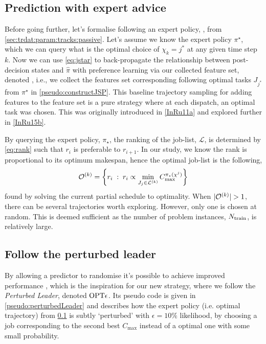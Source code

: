 \subsection{Prediction with expert advice}\label{sec:expertPolicy}
Before going further, let's formalise following an expert policy, 
\PhiSet{\OPT}, from \cref{sec:trdat:param:tracks:passive}.
Let's assume we know the expert policy $\pi^\star$, which we can query what 
is the optimal choice of $\chi_k={j^*}$ at any given time step $k$. 
Now we can use \cref{eq:jstar} to back-propagate the relationship between 
post-decision states and $\hat{\pi}$ with preference learning via our collected 
feature set, denoted \PhiSet{\OPT}, i.e., we collect the features set 
corresponding following optimal tasks $J_{j^*}$ from $\pi^\star$ in 
\cref{pseudo:constructJSP}.
This baseline trajectory sampling for adding features to the feature set 
is a pure strategy where at each dispatch, an optimal task was chosen.
This was originally introduced in \cref{InRu11a} and explored further in 
\cref{InRu15b}. 

By querying the expert policy, $\pi_\star$, the ranking of the job-list, 
$\mathcal{L}$, is determined by \cref{eq:rank} such that $r_{i}$ is preferable 
to $r_{i+1}$. 
In our study, we know the rank is proportional to its optimum makespan, hence 
the optimal job-list is the following, 
\begin{equation}
\mathcal{O}^{(k)}=\left\{r_i\;:\;r_i \propto \min_{J_j \in \mathcal{L}^{(k)}}
    C_{\max}^{\pi_\star({\mathbf{\chi}}^j)}\right\}
\end{equation}
found by solving the current partial schedule to optimality.
When $\lvert\mathcal{O}^{(k)}\rvert>1$, there can be several trajectories worth 
exploring. However, only one is chosen at random. This is deemed sufficient as 
the number of problem instances, $N_{\text{train}}$, is relatively large.

\subsection{Follow the perturbed leader}\label{sec:perturbedLeader}
By allowing a predictor to randomise it's possible to achieve improved 
performance \citep{CesaBianchi06,Hannan57}, which is the inspiration for our 
new strategy, where we follow the \emph{Perturbed Leader}, denoted 
$\text{OPT}\epsilon$. 
Its pseudo code is given in \cref{pseudo:perturbedLeader} and describes how the 
expert policy (i.e. optimal trajectory) from \cref{sec:expertPolicy} is subtly
`perturbed' with $\epsilon=10\%$ likelihood, by choosing a job corresponding 
to the second best $C_{\max}$ instead of a optimal one with some small 
probability. 

